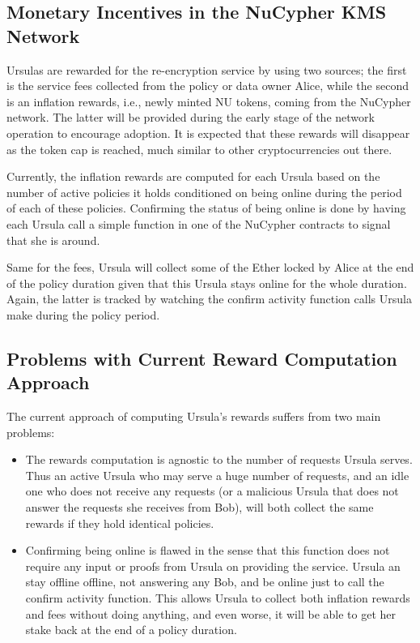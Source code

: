 \subsection{Monetary Incentives in the NuCypher KMS Network}
Ursulas are rewarded for the re-encryption service by using two sources; 
the first is the service fees collected from the policy or data 
owner Alice, while the second is an inflation rewards, i.e., newly minted 
NU tokens, coming from the NuCypher network. The latter will be provided during the 
early stage of the network operation to encourage 
adoption. It is expected that these rewards will disappear as the token cap is 
reached, much similar to other cryptocurrencies out there.


Currently, the inflation rewards are computed for each Ursula based on the number of 
active policies it holds conditioned on being online during the period of each of these 
policies. Confirming the status of being online is done by having each Ursula call a 
simple function in one of the NuCypher contracts to signal that she is around. 


Same for the fees, Ursula will collect some of the Ether locked by Alice at the end 
of the policy duration given that this Ursula stays online for the whole duration. 
Again, the latter is tracked by watching the confirm activity function calls Ursula 
make during the policy period.


\subsection{Problems with Current Reward Computation Approach}
The current approach of computing Ursula's rewards suffers from two 
main problems: 
\begin{itemize}
\setlength{\itemsep}{0pt}
\item The rewards computation is agnostic to the number of 
requests Ursula serves. Thus an active Ursula who may serve a huge number of 
requests, and an idle one who does not receive any requests (or a 
malicious Ursula that does not answer the requests she receives from Bob), will 
both collect the same rewards if they hold identical policies.

\item Confirming being online is flawed in the sense that this function does 
not require any input or proofs from Ursula on providing the service. Ursula 
an stay offline offline, not answering any Bob, and be online just to call the confirm activity 
function. This allows Ursula to collect both inflation rewards 
and fees without doing anything, and even worse, it will be able to get her stake back at 
the end of a policy duration.
\end{itemize}


